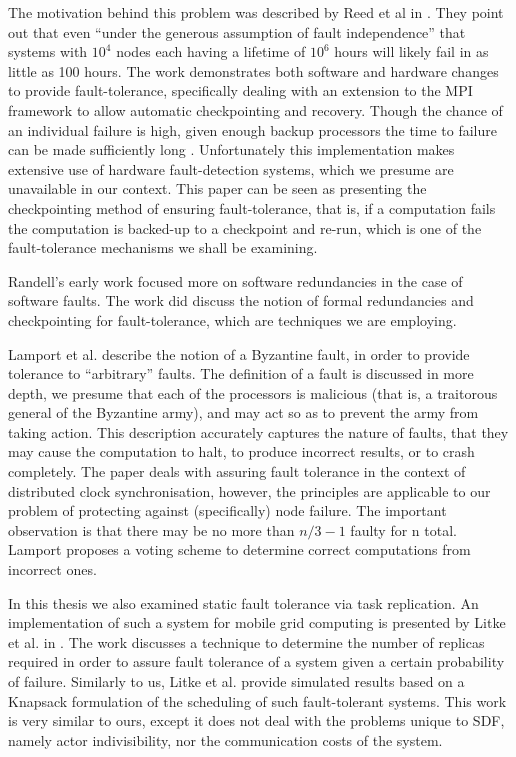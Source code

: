 The motivation behind this problem was described by Reed et al in \cite{ree06}.
They point out that even ``under the generous assumption of fault independence'' that systems with $10^4$ nodes each having a lifetime of $10^6$ hours will likely fail in as little as 100 hours.
The work demonstrates both software and hardware changes to provide fault-tolerance, specifically dealing with an extension to the MPI framework to allow automatic checkpointing and recovery.
Though the chance of an individual failure is high, given enough backup processors the time to failure can be made sufficiently long \cite{ree06}.
Unfortunately this implementation makes extensive use of hardware fault-detection systems, which we presume are unavailable in our context.
This paper can be seen as presenting the checkpointing method of ensuring fault-tolerance, that is, if a computation fails the computation is backed-up to a checkpoint and re-run, which is one of the fault-tolerance mechanisms we shall be examining.

Randell's early work \cite{ran75} focused more on software redundancies in the case of software faults.
The work did discuss the notion of formal redundancies and checkpointing for fault-tolerance, which are techniques we are employing.

Lamport et al. \cite{lam86} describe the notion of a Byzantine fault, in order to provide tolerance to ``arbitrary'' faults.
The definition of a fault is discussed in more depth, we presume that each of the processors is malicious (that is, a traitorous general of the Byzantine army), and may act so as to prevent the army from taking action.
This description accurately captures the nature of faults, that they may cause the computation to halt, to produce incorrect results, or to crash completely.
The paper deals with assuring fault tolerance in the context of distributed clock synchronisation, however, the principles are applicable to our problem of protecting against (specifically) node failure.
The important observation is that there may be no more than $n/3 - 1$ faulty for n total.
Lamport proposes a voting scheme \cite{lam86} to determine correct computations from incorrect ones.

In this thesis we also examined static fault tolerance via task replication.
An implementation of such a system for mobile grid computing is presented by Litke et al. in \cite{lit07}.
The work discusses a technique to determine the number of replicas required in order to assure fault tolerance of a system given a certain probability of failure.
Similarly to us, Litke et al. provide simulated results based on a Knapsack formulation of the scheduling of such fault-tolerant systems.
This work is very similar to ours, except it does not deal with the problems unique to SDF, namely actor indivisibility, nor the communication costs of the system.

